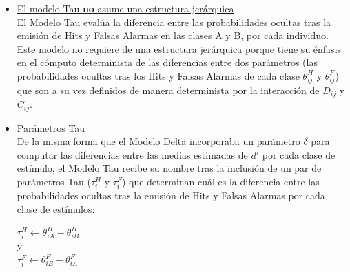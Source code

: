 \begin{itemize}
\item \underline{El modelo Tau \textbf{no} asume una estructura jerárquica}\\

El Modelo Tau evalúa la diferencia entre las probabilidades ocultas tras la emisión de Hits y Falsas Alarmas en las clases A y B, por cada individuo. Este modelo no requiere de una estructura jerárquica porque tiene su énfasis en el cómputo determinista de las diferencias entre dos parámetros (las probabilidades ocultas tras los Hits y Falsas Alarmas de cada clase $\theta^H_{ij}$ y $\theta^F_{ij}$) que son a su vez definidos de manera determinista por la interacción de $D_{ij}$ y $C_{ij}$.\\

\item \underline{Parámetros Tau}\\

De la misma forma que el Modelo Delta incorporaba un parámetro $\delta$ para computar las diferencias entre las medias estimadas de $d'$ por cada clase de estímulo, el Modelo Tau recibe su nombre tras la inclusión de un par de parámetros Tau ($\tau^H_{i}$ y $\tau^F_{i}$) que determinan cuál es la diferencia entre las probabilidades ocultas tras la emisión de Hits y Falsas Alarmas por cada clase de estímulos:\\

\begin{center}
$\tau^H_{i}\gets \theta^H_{iA}-\theta^H_{iB}$\\
y\\
$\tau^F_{i}\gets \theta^F_{iB}-\theta^F_{iA}$\\
\end{center}

\end{itemize}

